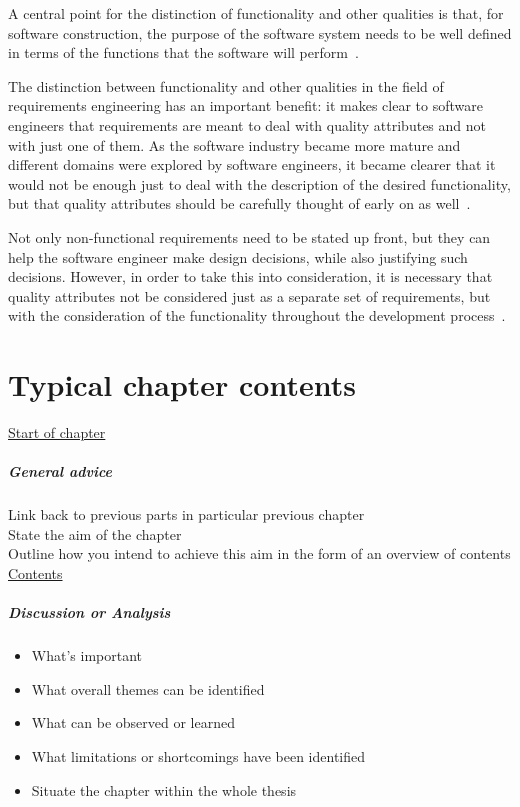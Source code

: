 \documentclass[dissertation,final]{softeng}
\begin{document}
A central point for the distinction of functionality and other qualities is that, for software construction, the purpose of the software system needs to be well defined in terms of the functions that the software will perform~\citep{Chung:2009vg}.

The distinction between functionality and other qualities in the field of requirements engineering has an important benefit: it makes clear to software engineers that requirements are meant to deal with quality attributes and not with just one of them. As the software industry became more mature and different domains were explored by software engineers, it became clearer that it would not be enough just to deal with the description of the desired functionality, but that quality attributes should be carefully thought of early on as well~\citep{Chung:2009vg}.

Not only non-functional requirements need to be stated up front, but they can help the software engineer make design decisions, while also justifying such decisions. However, in order to take this into consideration, it is necessary that quality attributes not be considered just as a separate set of requirements, but with the consideration of the functionality throughout the development process~\citep{Chung:2009vg}.

\chapter{Typical chapter contents}


\underline{Start of chapter}
\paragraph{General advice}
Link back to previous parts in particular previous chapter\\
State the aim of the chapter\\
Outline how you intend to achieve this aim in the form of an overview of contents\\

\noindent\underline{Contents}
\paragraph{Discussion or Analysis}
\begin{itemize}
\item What's important
\item What overall themes can be identified
\item What can be observed or learned
\item What limitations or shortcomings have been identified
\item Situate the chapter within the whole thesis
\end{itemize}
\end{document}
